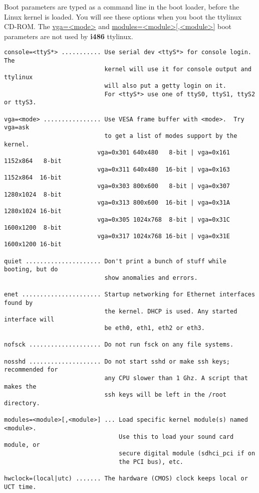 \documentclass[10pt]{article}
\begin{document}
Boot parameters are typed as a command line in the boot loader, before the
Linux kernel is loaded. You will see these options when you boot the ttylinux
CD-ROM. The \url{vga=<mode>} and \url{modules=<module>[,<module>]} boot
parameters are not used by {\bf i486} ttylinux.

\begin{lstlisting}
console=<ttyS*> ........... Use serial dev <ttyS*> for console login. The
                            kernel will use it for console output and ttylinux
                            will also put a getty login on it.
                            For <ttyS*> use one of ttyS0, ttyS1, ttyS2 or ttyS3.

vga=<mode> ................ Use VESA frame buffer with <mode>.  Try vga=ask
                            to get a list of modes support by the kernel.
                          vga=0x301 640x480   8-bit | vga=0x161 1152x864   8-bit
                          vga=0x311 640x480  16-bit | vga=0x163 1152x864  16-bit
                          vga=0x303 800x600   8-bit | vga=0x307 1280x1024  8-bit
                          vga=0x313 800x600  16-bit | vga=0x31A 1280x1024 16-bit
                          vga=0x305 1024x768  8-bit | vga=0x31C 1600x1200  8-bit
                          vga=0x317 1024x768 16-bit | vga=0x31E 1600x1200 16-bit

quiet ..................... Don't print a bunch of stuff while booting, but do
                            show anomalies and errors.

enet ...................... Startup networking for Ethernet interfaces found by
                            the kernel. DHCP is used. Any started interface will
                            be eth0, eth1, eth2 or eth3.

nofsck .................... Do not run fsck on any file systems.

nosshd .................... Do not start sshd or make ssh keys; recommended for
                            any CPU slower than 1 Ghz. A script that makes the
                            ssh keys will be left in the /root directory.

modules=<module>[,<module>] ... Load specific kernel module(s) named <module>.
                                Use this to load your sound card module, or
                                secure digital module (sdhci_pci if on
                                the PCI bus), etc.

hwclock=(local|utc) ....... The hardware (CMOS) clock keeps local or UCT time.


\end{lstlisting}
\end{document}
